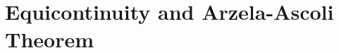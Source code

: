 \documentclass[class=article, crop=false]{standalone}
\begin{document}
\section{Equicontinuity and Arzela-Ascoli Theorem}
\end{document}

